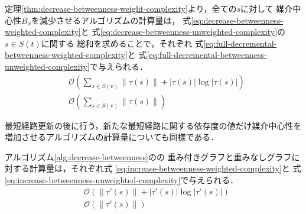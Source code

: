 定理\ref{thm:decrease-betweenness-weight-complexity}より，全ての$s$に対して
媒介中心性$B_x$を減少させるアルゴリズムの計算量は，
式\eqref{eq:decrease-betweenness-weighted-complexity}と
式\eqref{eq:decrease-betweenness-unweighted-complexity}の$s\in S(t)$に関する
総和を求めることで，それぞれ
式\eqref{eq:full-decremental-betweenness-weighted-complexity}と
式\eqref{eq:full-decremental-betweenness-unweighted-complexity}で与えられる．
\begin{align}
  &\mathcal{O}\left(\sum_{s\in S(v)}\|\tau(s)\|+|\tau(s)|\log|\tau(s)|\right)
  \label{eq:full-decremental-betweenness-weighted-complexity} \\
  &\mathcal{O}\left(\sum_{s\in S(v)}\|\tau(s)\|\right)
  \label{eq:full-decremental-betweenness-unweighted-complexity}
\end{align}

最短経路更新の後に行う，新たな最短経路に関する依存度の値だけ媒介中心性を
増加させるアルゴリズムの計算量についても同様である．

\begin{theorem}
  \label{thm:increase-betweenness-weight-complexity}
  アルゴリズム\ref{alg:decrease-betweenness}のの
  重み付きグラフと重みなしグラフに対する計算量は，それぞれ式
  \eqref{eq:increase-betweenness-weighted-complexity}と
  式\eqref{eq:increase-betweenness-unweighted-complexity}で与えられる．
  \begin{align}
    &\mathcal{O}\left(\|\tau'(s)\|+|\tau'(s)|\log|\tau'(s)|\right)
    \label{eq:increase-betweenness-weighted-complexity} \\
    &\mathcal{O}\left(\|\tau'(s)\|\right)
    \label{eq:increase-betweenness-unweighted-complexity}
  \end{align}
\end{theorem}

